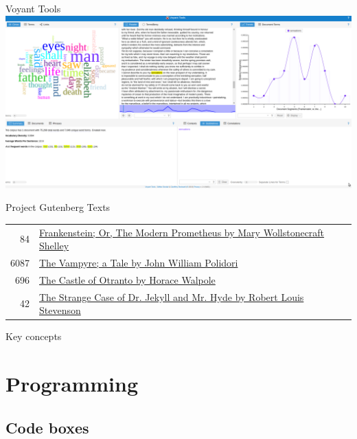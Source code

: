 \documentclass[10pt,a4paper]{article}
\begin{document}
\begin{multicols}{3}
\begin{textbox}{Voyant Tools}
\includegraphics[width=\textwidth]{voyant.png}
\end{textbox}




\begin{textbox}{Project Gutenberg Texts}
\begin{tabular}{r|p{}}\scriptsize
    84 & \href{http://www.gutenberg.org/ebooks/84}{Frankenstein; Or, The Modern Prometheus by Mary Wollstonecraft Shelley} \\
    6087 & \href{https://www.gutenberg.org/ebooks/6087}{The Vampyre; a Tale by John William Polidori} \\
    696 & \href{https://www.gutenberg.org/ebooks/696}{The Castle of Otranto by Horace Walpole} \\
    42 & \href{https://www.gutenberg.org/ebooks/42}{The Strange Case of Dr. Jekyll and Mr. Hyde by Robert Louis Stevenson}
\end{tabular}

\end{textbox}





\begin{textbox}{Key concepts}




\end{textbox}


\section{Programming}

\subsection{Code boxes}



\end{multicols}
\end{document}
